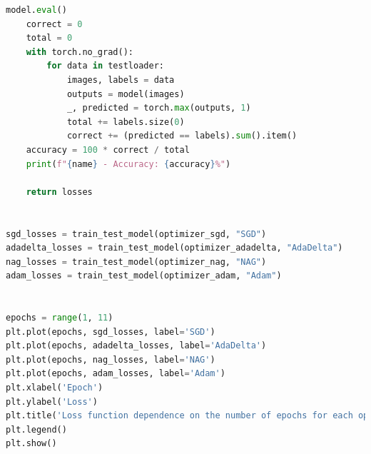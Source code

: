 \documentclass[a4paper, 14pt]{extarticle}
\begin{document}
\begin{lstlisting}[language={python},caption={LeNet},label={lst:code1}]
    model.eval()
    correct = 0
    total = 0
    with torch.no_grad():
        for data in testloader:
            images, labels = data
            outputs = model(images)
            _, predicted = torch.max(outputs, 1)
            total += labels.size(0)
            correct += (predicted == labels).sum().item()
    accuracy = 100 * correct / total
    print(f"{name} - Accuracy: {accuracy}%")

    return losses


sgd_losses = train_test_model(optimizer_sgd, "SGD")
adadelta_losses = train_test_model(optimizer_adadelta, "AdaDelta")
nag_losses = train_test_model(optimizer_nag, "NAG")
adam_losses = train_test_model(optimizer_adam, "Adam")


epochs = range(1, 11)
plt.plot(epochs, sgd_losses, label='SGD')
plt.plot(epochs, adadelta_losses, label='AdaDelta')
plt.plot(epochs, nag_losses, label='NAG')
plt.plot(epochs, adam_losses, label='Adam')
plt.xlabel('Epoch')
plt.ylabel('Loss')
plt.title('Loss function dependence on the number of epochs for each optimizer')
plt.legend()
plt.show()

\end{lstlisting}
\end{document}
